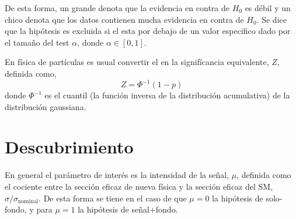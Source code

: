 De esta forma, un {\pvalue} grande denota que la evidencia en contra de $H_0$ es
débil y un {\pvalue} chico denota que los datos contienen mucha evidencia en
contra de $H_0$.
Se dice que la hipótesis es excluida si el {\pvalue} esta por debajo de un valor
especifico dado por el tama\~no del test $\alpha$, donde $\alpha \in [0,1]$.

En física de partículas es usual convertir el {\pvalue} en la signifícancia
equivalente, $Z$, definida como,
\begin{equation}
  Z = \Phi^{-1}(1-p)
\end{equation}
%
donde $\Phi^{-1}$ es el cuantil (la función inversa de la distribución
acumulativa) de la distribución gaussiana.





\section{Descubrimiento}

En general el parámetro de interés es la intensidad de la señal, $\mu$, definida
como el cociente entre la sección eficaz de nueva física y la sección eficaz del
SM, $\sigma/\sigma_\text{nominal}$. De esta forma se tiene en el caso de que
$\mu = 0$ la hipótesis de solo-fondo, y para $\mu = 1$ la hipótesis de
señal+fondo.



